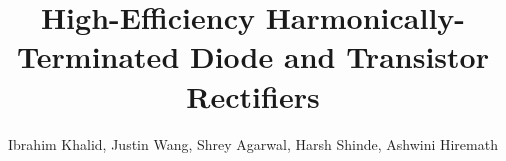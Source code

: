 %
%






\documentclass[journal]{IEEEtran}

\usepackage{xcolor,soul,framed} %

\usepackage[pdftex]{graphicx}
\graphicspath{{../pdf/}{../jpeg/}}

\usepackage[cmex10]{amsmath}
\usepackage{array}
\usepackage{mdwmath}
\usepackage{mdwtab}
\usepackage{eqparbox}
\usepackage{url}





    \title{High-Efficiency Harmonically-Terminated Diode and Transistor Rectifiers}
  \author{
  Ibrahim Khalid,
      Justin Wang,
      Shrey Agarwal,
      Harsh Shinde,
      Ashwini Hiremath
      }





\maketitle



